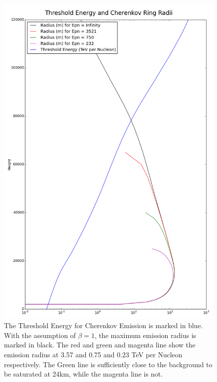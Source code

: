\documentclass[11pt]{article}
\begin{document}
\begin{figure}
\begin{center}
\includegraphics[height=0.9\textheight]{logenergyradius}
\caption{The Threshold Energy for Cherenkov Emission is marked in blue. With the assumption of $\beta=1$, the maximum emission radius is marked in black. The red and green and magenta line show the emission radius at 3.57 and 0.75 and 0.23 TeV per Nucleon respectively. The Green line is sufficiently close to the background to be saturated at 24km, while the magenta line is not.}
\label{fig:generalenergy}
\end{center}
\end{figure}
\end{document}
